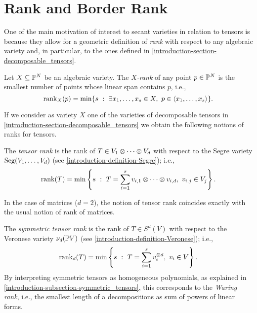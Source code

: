 \section{Rank and Border Rank}
\label{classicalAG-section-rank}

One of the main motivation of interest to secant varieties in relation to tensors is because they allow for a geometric definition of {\it rank} with respect to any algebraic variety and, in particular, to the ones defined in \ref{introduction-section-decomposable_tensors}.

\begin{definition}
\label{classicalAG-definition-Xrank}
    Let $X \subseteq \mathbb{P}^N$ be an algebraic variety. The \emph{$X$-rank} of any point $p \in \mathbb{P}^N$ is the smallest number of points whose linear span contains $p$, i.e., 
    \[
        \mathrm{rank}_X(p) = \min\{s ~:~ \exists x_1,\ldots,x_s \in X, ~ p \in \langle x_1,\ldots,x_s \rangle\}.
    \]
\end{definition}

If we consider as variety $X$ one of the varieties of decomposable tensors in \ref{introduction-section-decomposable_tensors} we obtain the following notions of ranks for tensors.

\begin{definition}
\label{classicalAG-definition-tensor_rank}
    The \emph{tensor rank} is the rank of $T \in V_1 \otimes \cdots \otimes V_d$ with respect to the Segre variety $\mathrm{Seg}(V_1,\ldots,V_d)$ (see \ref{introduction-definition-Segre}); i.e., 
    \[
        \mathrm{rank}(T) = \min\left\{s ~:~ T = \sum_{i=1}^s v_{i,1}\otimes \cdots \otimes v_{i,d}, ~ v_{i,j} \in V_j\right\}.
    \]
    \begin{example}
        In the case of matrices ($d=2$), the notion of tensor rank coincides exactly with the usual notion of rank of matrices.
    \end{example}
\end{definition}

\begin{definition}
\label{classicalAG-definition-symmetric_tensor_rank}
    The \emph{symmetric tensor rank} is the rank of $T \in S^d(V)$ with respect to the Veronese variety $\nu_d(\mathbb{P} V)$ (see \ref{introduction-definition-Veronese}); i.e., 
    \[
        \mathrm{rank}_d(T) = \min\left\{s ~:~ T = \sum_{i=1}^s v_{i}^{\otimes d}, ~ v_{i} \in V\right\}.
    \]
    By interpreting symmetric tensors as homogeneous polynomials, as explained in \ref{introduction-subsection-symmetric_tensors}, this corresponds to the \emph{Waring rank}, i.e., the smallest length of a decompositions as sum of powers of linear forms.
\end{definition}  

